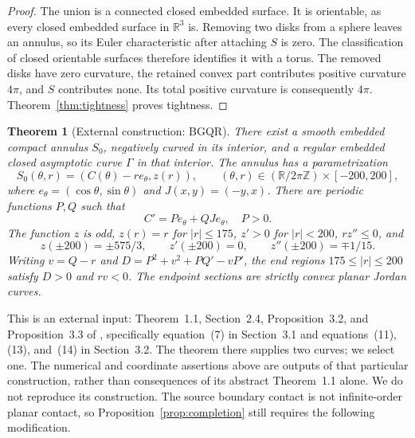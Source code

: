 \documentclass[11pt]{amsart}
\newtheorem{theorem}{Theorem}[section]
\theoremstyle{definition}
\newcommand{\R}{\mathbb R}
\begin{document}
\begin{proof}
The union is a connected closed embedded surface. It is orientable,
as every closed embedded surface in $\R^3$ is. Removing two disks
from a sphere leaves an annulus, so its Euler characteristic after
attaching $S$ is zero. The classification of closed orientable
surfaces therefore identifies it with a torus. The removed disks
have zero curvature, the retained convex part contributes positive
curvature $4\pi$, and $S$ contributes none. Its total positive
curvature is consequently $4\pi$.
Theorem~\ref{thm:tightness} proves tightness.
\end{proof}

\begin{theorem}[External construction: BGQR]\label{thm:bgqr}
There exist a smooth embedded compact annulus $S_0$, negatively curved
in its interior, and a regular embedded closed asymptotic curve
$\Gamma$ in that interior. The annulus has a parametrization
\[
 S_0(\theta,r)=(C(\theta)-r e_\theta,z(r)),
 \qquad (\theta,r)\in(\R/2\pi\mathbb Z)\times[-200,200],
\]
where $e_\theta=(\cos\theta,\sin\theta)$ and $J(x,y)=(-y,x)$.
There are periodic functions $P,Q$ such that
\[
 C'=P e_\theta+QJe_\theta,\quad P>0.
\]
The function $z$ is odd, $z(r)=r$ for $|r|\le175$, $z'>0$ for
$|r|<200$, $rz''\le0$, and
\[
 z(\pm200)=\pm575/3,\qquad z'(\pm200)=0,\qquad
 z''(\pm200)=\mp1/15.
\]
Writing $v=Q-r$ and $D=P^2+v^2+PQ'-vP'$, the end regions
$175\le|r|\le200$ satisfy $D>0$ and $rv<0$.
The endpoint sections are strictly convex planar Jordan curves.
\end{theorem}

This is an external input: Theorem~1.1, Section~2.4,
Proposition~3.2, and Proposition~3.3 of \cite{BGQR}, specifically
equation~(7) in Section~3.1 and equations~(11), (13), and~(14) in
Section~3.2. The theorem there supplies two curves; we select one.
The numerical and coordinate assertions above are outputs of that
particular construction, rather than consequences of its abstract
Theorem~1.1 alone. We do not reproduce its construction.
The source boundary contact is not infinite-order planar contact,
so Proposition~\ref{prop:completion} still requires the following
modification.
\end{document}

